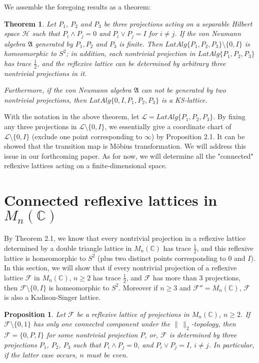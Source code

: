 \documentclass[12pt]{article}
\newtheorem{theorem}{Theorem}[section]
\newtheorem{prop}{Proposition}[section]
\newcommand{\AAA}{\mathfrak A}
\newcommand{\HHH}{\mathcal H} %
\newcommand{\LLL}{\mathcal L} %
\newcommand{\FFF}{\mathcal F}
\newcommand{\C}{\mathbb C} %
\begin{document}
{We assemble the foregoing results as a theorem:

\begin{theorem} Let $P_1$, $P_2$ and $P_3$ be three projections acting on a separable Hilbert space $\HHH$ such that
$P_i \wedge P_j = 0$ and $P_i \vee P_j = I$ for $i \neq j$. If the von Neumann algebra $\AAA$ generated by $P_1, P_2$ and
$P_3$ is finite. Then
$LatAlg\{P_1,P_2,P_3\}\setminus \{0, I \}$ is homeomorphic to
$S^{2}$; in addition, each nontrivial projection in
$LatAlg\{P_1,P_2,P_3\}$ has trace $\frac 12$, and the reflexive
lattice can be determined by arbitrary three nontrivial
projections in it.

Furthermore, if the von Neumann algebra $\AAA$ can not be generated
by two nontrivial projections, then $LatAlg\{0,I,P_1,P_2,P_3\}$ is a
KS-lattice.
\end{theorem}

With the notation in the above theorem, let $\LLL = LatAlg\{P_1,P_2,P_3\}$. By fixing any three projections in $\LLL \setminus  \{0,I\} $, we essentially give 
a coordinate chart of  $\LLL \setminus  \{0,I\} $ (exclude one point corresponding to $\infty$) by Proposition 2.1. It can be showed
that the transition map is M\"{o}bius  transformation. We will address this issue in our forthcoming paper. 
As for now, we will determine all the "connected" reflexive lattices acting on a finite-dimensional space.


\section{Connected reflexive lattices in $M_n(\C)$}

By Theorem 2.1, we know that every nontrivial projection in a
reflexive lattice determined by a double triangle lattice in
$M_n(\C)$ has trace $\frac12$, and this reflexive
lattice is homeomorphic to $S^2$ (plus two distinct points
corresponding to $0$ and $I$). In this section, we will show that if
every nontrivial projection of a reflexive lattice $\mathcal{F}$ in $M_n(\C)$, $n\geq 2$ 
has trace $\frac12$, and $\FFF$ has more than 3 projections, then
$\mathcal{F}\setminus\{0,I\}$ is  homeomorphic to $S^2$. 
Moreover if $n \geq 3$ and $\FFF'' = M_n(\C)$, $\mathcal{F}$ is also a Kadison-Singer lattice.

\begin{prop}
 Let $\FFF$ be a reflexive lattice of projections
in $M_n(\C)$, $n\geq 2$. If $\FFF \setminus \{0, 1 \}$ has only
one connected component under the $\|\,\|_2$-topology, then
$\FFF=\{0,P,I\}$ for some nontrivial projection $P$, or, $\FFF$ is
determined by three projections $P_1$, $P_2$, $P_3$ such that $P_i
\wedge P_j = 0$, and $P_i \vee P_j = I$, $i \neq j$. In particular,
if the latter case occurs, $n$ must be even.
\end{prop}

}
\end{document}
